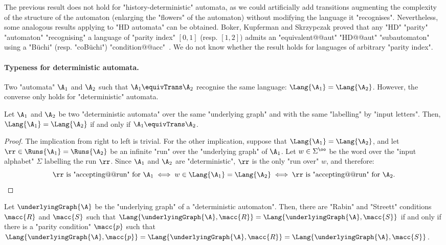 \documentclass[10pt,a4paper]{amsart}
\renewcommand{\SS}{\Sigma}
\begin{document}
The previous result does not hold for "history-deterministic" automata, as we could artificially add transitions augmenting the complexity of the structure of the automaton (enlarging the "flowers" of the automaton) without modifying the language it "recognises". Nevertheless, some analogous results applying to "HD automata" can be obtained.  Boker, Kupferman and Skrzypczak proved that any "HD" "parity" "automaton" "recognising" a language of "parity index" $[0,1]$ (resp. $[1,2]$) admits an "equivalent@@aut" "HD@@aut" "subautomaton" using a "B\"uchi" (resp. "coB\"uchi") "condition@@acc"~\cite[Theorems~10 and~13]{BKS17HowDeterministicGFG}. We do not know whether the result holds for languages of arbitrary "parity index".


\paragraph*{Typeness for deterministic automata.}
Two "automata" $\A_1$ and $\A_2$ such that $\A_1 \equivTrans \A_2$ recognise the same language: $\Lang{\A_1} = \Lang{\A_2}$. However, the converse only holds for "deterministic" automata.

\begin{lemma}\label{lemma-typ:equivalece_automata_languages}
	Let $\A_1$ and $\A_2$ be two "deterministic automata" over the same "underlying graph" and with the same "labelling" by "input letters". Then, $\Lang{\A_1} = \Lang{\A_2}$ if and only if $\A_1 \equivTrans \A_2$.
\end{lemma}
\begin{proof}
	The implication from right to left is trivial. For the other implication, suppose that $\Lang{\A_1} = \Lang{\A_2}$, and let $\rr \in \Runs{\A_1}=\Runs{\A_2}$ be an infinite "run" over the "underlying graph" of $\A_1$. Let $w\in \SS^\oo$ be the word over the "input alphabet" $\SS$ labelling the run $\rr$. Since $\A_1$ and $\A_2$ are "deterministic", $\rr$ is the only "run over" $w$, and therefore:
	\[ \rr \text{ is "accepting@@run" for } \A_1 \iff w\in \Lang{\A_1}=\Lang{\A_2} \iff \rr \text{ is "accepting@@run" for } \A_2. \qedhere\]
\end{proof}

\begin{corollary}
	Let $\underlyingGraph{\A}$ be the "underlying graph" of a "deterministic automaton". Then, there are "Rabin" and "Streett" conditions $\macc{R}$ and $\macc{S}$ such that $\Lang{\underlyingGraph{\A},\macc{R}} = \Lang{\underlyingGraph{\A},\macc{S}}$ if and only if there is a "parity condition" $\macc{p}$ such that $\Lang{\underlyingGraph{\A},\macc{p}}=\Lang{\underlyingGraph{\A},\macc{R}} = \Lang{\underlyingGraph{\A},\macc{S}}$.
\end{corollary}
\end{document}

